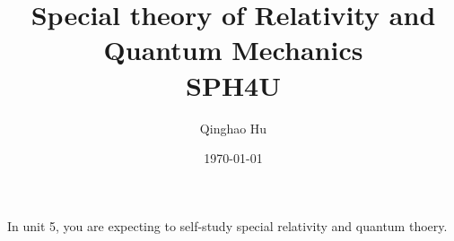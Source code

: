 \documentclass[a4paper]{report}
\title{\textbf{Special theory of Relativity and Quantum Mechanics} \\ \large SPH4U}
\author{Qinghao Hu}
\date{\today}
\theoremstyle{remark}
\begin{document}
\maketitle

In unit 5, you are expecting to self-study special relativity and quantum thoery. 

\newpage
\tableofcontents





% 
\end{document}
